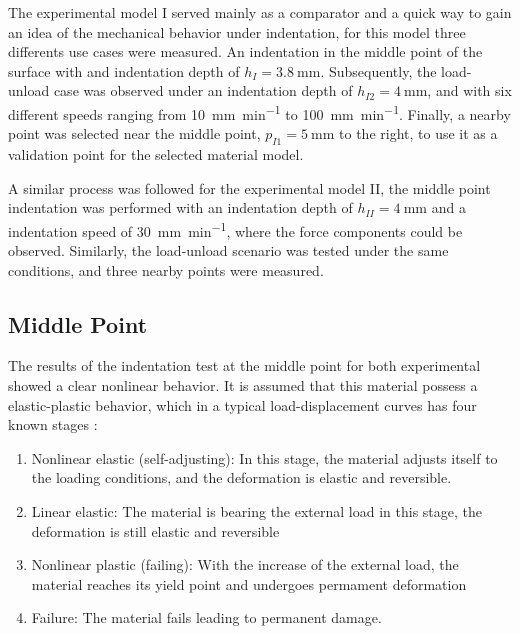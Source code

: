 The experimental model I served mainly as a comparator and a quick way to gain an idea of the 
mechanical behavior under indentation, for this model three differents use cases were measured. 
An indentation in the middle point of the surface with and indentation depth of $h_{I} = \SI{3.8}{\milli \m}$. 
Subsequently, the load-unload case was observed under an indentation depth of  $h_{I2} = \SI{4}{\milli \m}$, and 
with six different speeds ranging from \SI[per-mode = symbol]{10}{\milli \m\per \minute} to 
\SI[per-mode = symbol]{100}{\milli \m\per \minute}. 
Finally, a nearby point was selected near the middle point, $p_{I1} = \SI{5}{\milli \m}$ to the right,
 to use it as a validation point for the selected material model. 

A similar process was followed for the experimental model II, the middle point indentation was 
performed with an indentation depth of $h_{II} = \SI{4}{\milli \m}$ and a indentation 
speed of \SI[per-mode = symbol]{30}{\milli \m\per \minute}, where the force components 
could be observed. Similarly, the load-unload scenario was tested under the same conditions, and three 
nearby points were measured.

\subsection*{Middle Point}
\label{subsection:midpointresult}
The results of the indentation test at the middle point for both experimental showed a clear 
nonlinear behavior.  It is assumed that this material 
possess a elastic-plastic behavior, which in a typical load-displacement curves has four known stages \cite{Goharian2017}:

\begin{enumerate}
    \item Nonlinear elastic (self-adjusting): In this stage, the material adjusts itself to the loading conditions, and the deformation is elastic and reversible.
    \item Linear elastic: The material is bearing the external load in this stage, the deformation is still elastic and reversible 
    \item Nonlinear plastic (failing): With the increase of the external load, the material reaches its yield point and undergoes permament deformation
    \item Failure: The material fails leading to permanent damage.
\end{enumerate}


